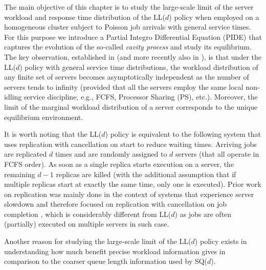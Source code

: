 \documentclass[12pt]{report}
\begin{document}
The main objective of this chapter is to study the large-scale limit of the server workload and response time distribution of the LL($d$) policy
when employed on a homogeneous cluster subject to Poisson job arrivals with general service times. For this purpose we introduce a Partial Integro Differential Equation (PIDE) that captures the evolution of the so-called {\it cavity process} and study its equilibrium.  
The key observation, established in \cite{bramson2012asymptotic} (and more recently also in \cite{shneer2020large}), is that under the LL($d$) policy with general service time distributions,
the workload distribution of any finite set of servers becomes asymptotically independent as the number of servers tends to infinity
(provided that all the servers employ the same local non-idling service discipline, e.g., FCFS, Processor Sharing (PS), etc.). 
Moreover, the limit of the marginal workload distribution of a server corresponds to the unique equilibrium environment.

It is worth noting that the LL($d$) policy is equivalent to the following system that uses replication with cancellation on start to reduce waiting times. Arriving jobs are replicated $d$ times and are randomly assigned to $d$ servers (that all operate in FCFS order).
As soon as a single replica starts execution on a server, the remaining $d-1$ replicas are killed (with the additional
assumption that if multiple replicas start at exactly the same time, only one is executed). Prior work on replication 
was mainly done in the context of systems that experience server slowdown and therefore focused on
replication with cancellation on job completion \cite{gardnerSIGM,gardnerOR}, which is considerably different 
from LL($d$) as jobs are often (partially) executed on multiple servers in such case. 

Another reason for studying the large-scale limit of the LL($d$) policy exists in understanding how much benefit precise workload information 
gives in comparison to the coarser queue length information used by SQ($d$).
\end{document}
